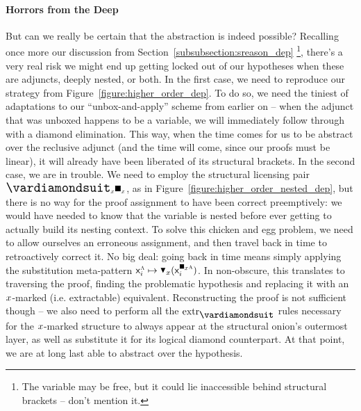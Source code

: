 \paragraph{Horrors from the Deep}
But can we really be certain that the abstraction is indeed possible?
Recalling once more our discussion from Section~\ref{subsubsection:sreason_dep}%
	\footnote{The variable may be free, but it could lie inaccessible behind structural brackets -- don't mention it.},
there's a very real risk we might end up getting locked out of our hypotheses when these are adjuncts, deeply nested, or both.
In the first case, we need to reproduce our strategy from Figure~\ref{figure:higher_order_dep}.
To do so, we need the tiniest of adaptations to our ``unbox-and-apply'' scheme from earlier on -- when the adjunct that was unboxed happens to be a variable, we will immediately follow through with a diamond elimination.
This way, when the time comes for us to be abstract over the reclusive adjunct (and the time will come, since our proofs must be linear), it will already have been liberated of its structural brackets.
In the second case, we are in trouble. 
We need to employ the structural licensing pair $\dxdia{x}\dxbox{x}$, as in Figure~\ref{figure:higher_order_nested_dep}, but there is no way for the proof assignment to have been correct preemptively: we would have needed to know that the variable is nested before ever getting to actually build its nesting context.
To solve this chicken and egg problem, we need to allow ourselves an erroneous assignment, and then travel back in time to retroactively correct it.
No big deal: going back in time means simply applying the substitution meta-pattern $\vari^{\smallgtype{a}} \mapsto \dboxelim{x}(\vari^{\dxbox{x}\smallgtype{a}})$.
In non-obscure, this translates to traversing the proof, finding the problematic hypothesis and replacing it with an $\mathnormal{x}$-marked (i.e. extractable) equivalent.
Reconstructing the proof is not sufficient though -- we also need to perform all the $\Extraction$ rules necessary for the $\mathnormal{x}$-marked structure to always appear at the structural onion's outermost layer, as well as substitute it for its logical diamond counterpart.
At that point, we are at long last able to abstract over the hypothesis.

